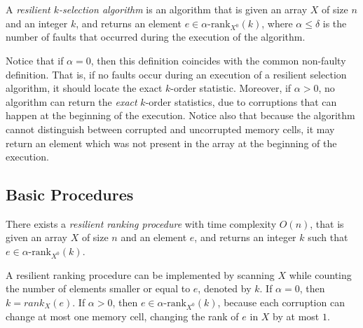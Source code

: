 \documentclass{llncs}
\begin{document}
\begin{definition}
\label{def:resilient-selection-algorithm}
A \emph{resilient $k$-selection algorithm} is an algorithm that is given an array $X$ of size $n$ and an integer $k$, and returns an element $e \in \alpha\text{-rank}_{X^0}(k)$, where $\alpha \leq \delta$ is the number of faults that occurred during the execution of the algorithm.~\end{definition}

Notice that if $\alpha=0$, then this definition coincides with the common non-faulty definition. That is, if no faults occur during an execution of a resilient selection algorithm, it should locate the exact $k$-order statistic.
Moreover, if $\alpha>0$, no algorithm can return the \emph{exact} $k$-order statistics, due to corruptions that can happen at the beginning of the execution.
Notice also that because the algorithm cannot distinguish between corrupted and uncorrupted memory cells, it may return an element which was not present in the array at the beginning of the execution.


















\subsection{Basic Procedures}

\begin{lemma}
\label{def:ranking-procedure}
There exists a \emph{resilient ranking procedure} with time complexity $O(n)$, that is given an array $X$ of size $n$ and an element $e$, and returns an integer $k$ such that $e \in \alpha\text{-rank}_{X^0}(k)$.
\end{lemma}

\begin{pf}
A resilient ranking procedure can be implemented by scanning $X$ while counting the number of elements smaller or equal to $e$, denoted by $k$. If $\alpha = 0$, then $k = rank_X(e)$. If $\alpha > 0$, then $e \in \alpha\text{-rank}_{X^0}(k)$, because each corruption can change at most one memory cell, changing the rank of $e$ in $X$ by \linebreak at most $1$.
\end{pf}
\end{document}
